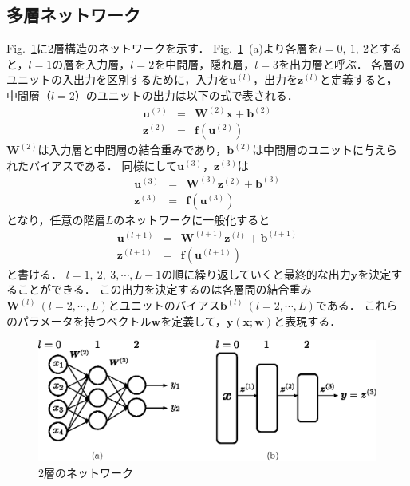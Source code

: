 \documentclass[a4paper,10pt]{jsarticle}
\begin{document}
\subsection{多層ネットワーク}
Fig.~\ref{fig:2層のネットワーク}に2層構造のネットワークを示す．
Fig.~\ref{fig:2層のネットワーク}~(a)より各層を$l=0,\ 1,\ 2$とすると，$l=1$の層を入力層，$l=2$を中間層，隠れ層，$l=3$を出力層と呼ぶ．
各層のユニットの入出力を区別するために，入力を$\bm{u}^{(l)}$，出力を$\bm{z}^{(l)}$と定義すると，中間層（$l=2$）のユニットの出力は以下の式で表される．
\begin{eqnarray}
\label{eq:3a}
  \bm{u}^{(2)} &=& \bm{W}^{(2)}\bm{x} + \bm{b}^{(2)} \\
  \bm{z}^{(2)} &=& \bm{f}(\bm{u}^{(2)})
\end{eqnarray}
$\bm{W}^{(2)}$は入力層と中間層の結合重みであり，$\bm{b}^{(2)}$は中間層のユニットに与えられたバイアスである．
同様にして$\bm{u}^{(3)}$，$\bm{z}^{(3)}$は
\begin{eqnarray}
\label{eq:3b}
  \bm{u}^{(3)} &=& \bm{W}^{(3)}\bm{z}^{(2)} + \bm{b}^{(3)} \\
  \bm{z}^{(3)} &=& \bm{f}(\bm{u}^{(3)})
\end{eqnarray}
となり，任意の階層$L$のネットワークに一般化すると
\begin{eqnarray}
\label{eq:3c}
  \bm{u}^{(l+1)} &=& \bm{W}^{(l+1)}\bm{z}^{(l)} + \bm{b}^{(l+1)} \\
  \bm{z}^{(l+1)} &=& \bm{f}(\bm{u}^{(l+1)})
\end{eqnarray}
と書ける．
$l=1,\ 2,\ 3,\cdots, L-1$の順に繰り返していくと最終的な出力$\bm{y}$を決定することができる．
この出力を決定するのは各層間の結合重み$\bm{W}^{(l)}\ (l=2,\cdots, L)$とユニットのバイアス$\bm{b}^{(l)}\ (l=2,\cdots, L)$である．
これらのパラメータを持つベクトル$\bm{w}$を定義して，$\bm{y}(\bm{x};\bm{w})$と表現する．

\begin{figure}[tb]
  \begin{center}
    \includegraphics[clip,width=12cm]{fig/eps/unit.eps}
  \end{center}
  \caption{2層のネットワーク}
  \label{fig:2層のネットワーク}
\end{figure}
\end{document}
